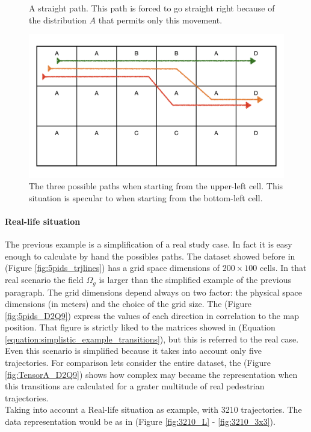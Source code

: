 \documentclass[class=article, crop=false]{standalone}
\begin{document}
\begin{figure}[ht]
\begin{minipage}[c]{0.5\linewidth}
\captionsetup{width=.8\linewidth}
\caption{A straight path. This path is forced to go straight right because of the distribution $A$ that permits only this movement.}
\label{fig:simplistic_example_4}
\end{minipage}
\begin{minipage}[c]{0.5\linewidth}
\centering
\includegraphics[scale=0.1]{draw/Thesis_plots/Thesis_plots.005}
\captionsetup{width=.8\linewidth}
\caption{The three possible paths when starting from the upper-left cell. This situation is specular to when starting from the bottom-left cell.}
\label{fig:simplistic_example_5}
\end{minipage}
\end{figure}

\paragraph{Real-life situation}
The previous example is a simplification of a real study case.
In fact it is easy enough to calculate by hand the possibles paths.
The dataset showed before in (Figure \ref{fig:5pids_trjlines}) has a grid space dimensions of $200 \times 100$ cells.
In that real scenario the field $\Omega_g$ is larger than the simplified example of the previous paragraph.
The grid dimensions depend always on two factor: the physical space dimensions (in meters) and the choice of the grid size.
The (Figure \ref{fig:5pids_D2Q9}) express the values of each direction in correlation to the map position.
That figure is strictly liked to the matrices showed in (Equation \ref{equation:simplistic_example_transitions}), but this is referred to the real case.
Even this scenario is simplified because it takes into account only five trajectories.
For comparison lets consider the entire dataset, the (Figure \ref{fig:TensorA_D2Q9}) shows how complex may became the representation when this transitions are calculated for a grater multitude of real pedestrian trajectories.
\\Taking into account a Real-life situation as example, with 3210 trajectories.
The data representation would be as in (Figure \ref{fig:3210_L} - \ref{fig:3210_3x3}).
\end{document}
